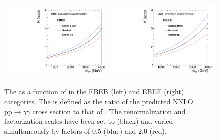 \begin{figure}[hbtp!]
  \centering
  \includegraphics[width=0.49\textwidth]{figures/kfactorScaleVariations_BB.pdf}
  \includegraphics[width=0.49\textwidth]{figures/kfactorScaleVariations_BE.pdf}
  \caption{The \Kfactor as a function of \mgg in the EBEB (left) and EBEE (right) categories. The \Kfactor is defined as the ratio of the predicted \MCFM NNLO $\mathrm{pp} \to \gamma\gamma$ cross section to that of \SHERPA. The renormalization and factorization scales have been set to \mgg (black) and varied simultaneously by factors of 0.5 (blue) and 2.0 (red).}
  \label{fig:kfactor_comparison_NNLO}
\end{figure}

